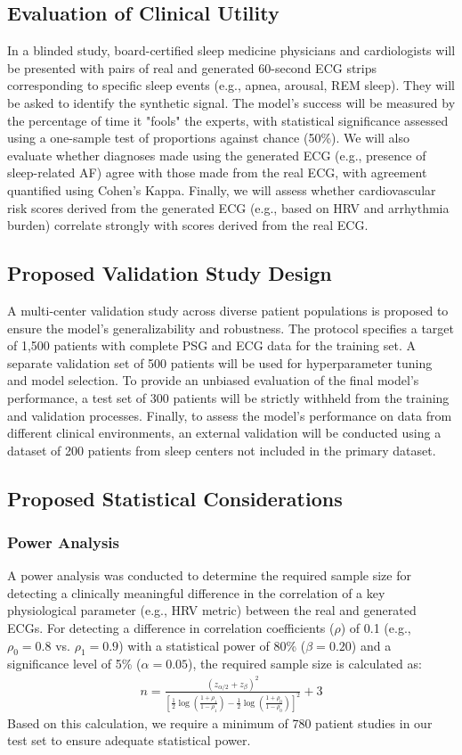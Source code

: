 \documentclass[11pt,en]{elegantpaper}
\begin{document}
\subsection{Evaluation of Clinical Utility}
In a blinded study, board-certified sleep medicine physicians and cardiologists will be presented with pairs of real and generated 60-second ECG strips corresponding to specific sleep events (e.g., apnea, arousal, REM sleep). They will be asked to identify the synthetic signal. The model's success will be measured by the percentage of time it "fools" the experts, with statistical significance assessed using a one-sample test of proportions against chance (50\%). We will also evaluate whether diagnoses made using the generated ECG (e.g., presence of sleep-related AF) agree with those made from the real ECG, with agreement quantified using Cohen's Kappa. Finally, we will assess whether cardiovascular risk scores derived from the generated ECG (e.g., based on HRV and arrhythmia burden) correlate strongly with scores derived from the real ECG.

\subsection{Proposed Validation Study Design}
A multi-center validation study across diverse patient populations is proposed to ensure the model's generalizability and robustness. The protocol specifies a target of 1,500 patients with complete PSG and ECG data for the training set. A separate validation set of 500 patients will be used for hyperparameter tuning and model selection. To provide an unbiased evaluation of the final model's performance, a test set of 300 patients will be strictly withheld from the training and validation processes. Finally, to assess the model's performance on data from different clinical environments, an external validation will be conducted using a dataset of 200 patients from sleep centers not included in the primary dataset.

\subsection{Proposed Statistical Considerations}

\subsubsection{Power Analysis}
A power analysis was conducted to determine the required sample size for detecting a clinically meaningful difference in the correlation of a key physiological parameter (e.g., HRV metric) between the real and generated ECGs. For detecting a difference in correlation coefficients ($\rho$) of 0.1 (e.g., $\rho_0=0.8$ vs. $\rho_1=0.9$) with a statistical power of 80\% ($\beta = 0.20$) and a significance level of 5\% ($\alpha = 0.05$), the required sample size is calculated as:
\begin{align}
n = \frac{(z_{\alpha/2} + z_\beta)^2}{[\frac{1}{2}\log(\frac{1+\rho_1}{1-\rho_1}) - \frac{1}{2}\log(\frac{1+\rho_0}{1-\rho_0})]^2} + 3
\end{align}
Based on this calculation, we require a minimum of 780 patient studies in our test set to ensure adequate statistical power.
\end{document}
